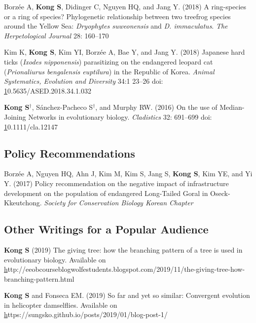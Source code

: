 \documentclass[11pt]{article}
\begin{document}
\begin{etaremune}
\item Borzée A,\textbf{ Kong S}, Didinger C, Nguyen HQ, and Jang Y. (2018) A ring-species or a ring of species? Phylogenetic relationship between two treefrog species around the Yellow Sea: \textit{Dryophytes suweonensis }and \textit{D. immaculatus}. \textit{The Herpetological Journal} 28: 160–170 
\item Kim K, \textbf{Kong S}, Kim YI, Borzée A, Bae Y, and Jang Y. (2018) Japanese hard ticks (\textit{Ixodes nipponensis}) parasitizing on the endangered leopard cat (\textit{Prionaliurus bengalensis euptilura}) in the Republic of Korea. \textit{Animal Systematics, Evolution and Diversity} 34:1 23–26 doi: \href{10.5635/ASED.2018.34.1.032}10.5635/ASED.2018.34.1.032
\item \textbf{Kong S}{$^\dag$}, Sánchez-Pacheco S{$^\dag$}, and Murphy RW. (2016) On the use of Median-Joining Networks in evolutionary biology. \textit{Cladistics} 32: 691–699 doi: \href{https://doi.org/10.1111/cla.12147}10.1111/cla.12147

\end{etaremune}

\subsection*{Policy Recommendations}
\begin{etaremune}


\item Borzée A, Nguyen HQ, Ahn J, Kim M, Kim S, Jang S, \textbf{Kong S}, Kim YE, and Yi Y. (2017) Policy recommendation on the negative impact of infrastructure development on the population of endangered Long-Tailed Goral in Oseck-Kkeutchong. \textit{Society for Conservation Biology Korean Chapter}

\end{etaremune}

\subsection*{Other Writings for a Popular Audience}
\begin{etaremune}

\item \textbf{Kong S} (2019) The giving tree: how the branching pattern of a tree is used in evolutionary biology. Available on \href{http://eeobcourseblogwolfestudents.blogspot.com/2019/11/the-giving-tree-how-branching-pattern.html}http://eeobcourseblogwolfestudents.blogspot.com/2019/11/the-giving-tree-how-branching-pattern.html
\item \textbf{Kong S} and Fonseca  EM. (2019) So far and yet so similar: Convergent evolution in helicopter damselflies. Available on \href{https://sungsko.github.io/posts/2019/01/blog-post-1/}https://sungsko.github.io/posts/2019/01/blog-post-1/



\end{etaremune}
\end{document}

